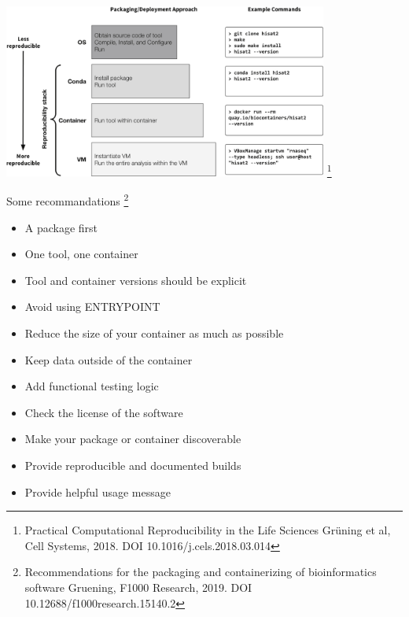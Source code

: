 \begin{frame}
\centering\includegraphics[width=0.8\textwidth]{images/reproductibility.jpg} \footnote{Practical Computational Reproducibility in the Life Sciences
Grüning et al, Cell Systems, 2018. DOI 10.1016/j.cels.2018.03.014}
\end{frame}
\begin{frame}[<+->]
Some recommandations \footnote{Recommendations for the packaging and containerizing of bioinformatics software Gruening, F1000 Research, 2019. DOI 10.12688/f1000research.15140.2}
\begin{itemize}
\item A package first
\item One tool, one container
\item Tool and container versions should be explicit
\item Avoid using ENTRYPOINT
\item Reduce the size of your container as much as possible
\item Keep data outside of the container
\item Add functional testing logic
\item Check the license of the software
\item Make your package or container discoverable
\item Provide reproducible and documented builds
\item Provide helpful usage message
\end{itemize}
\end{frame}